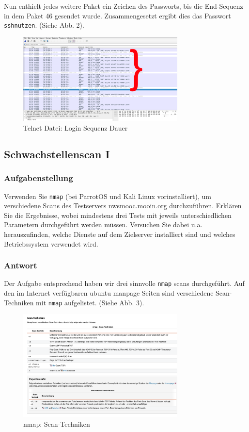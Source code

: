 \documentclass{article}
\begin{document}
Nun enthielt jedes weitere Paket ein Zeichen des Passworts, bis die End-Sequenz
in dem Paket 46 gesendet wurde. Zusammengesetzt ergibt dies das 
Passwort \texttt{sshnutzen}. (Siehe Abb. 2).

\begin{figure}[H]
	\includegraphics[width=0.75\textwidth]{images/02}
	\centering
	\caption{Telnet Datei: Login Sequenz Dauer}
\end{figure}

\newpage

\subsection{Schwachstellenscan I}

\subsubsection*{Aufgabenstellung}

Verwenden Sie \texttt{nmap} (bei ParrotOS und Kali Linux vorinstalliert), um verschiedene 
Scans des Testservers nwsmooc.mooin.org durchzuführen. Erklären Sie die Ergebnisse, wobei 
mindestens drei Tests mit jeweils unterschiedlichen Parametern durchgeführt werden müssen. 
Versuchen Sie dabei u.a. herauszufinden, welche Dienste auf dem Zielserver installiert
sind und welches Betriebssystem verwendet wird.

\subsubsection*{Antwort}

Der Aufgabe entsprechend haben wir drei sinnvolle \texttt{nmap} scans durchgeführt.
Auf den im Internet verfügbaren ubuntu manpage Seiten sind verschiedene Scan-Techniken mit
\texttt{nmap} aufgelistet. (Siehe Abb. 3).

\begin{figure}[H]
	\includegraphics[width=0.75\textwidth]{images/03}
	\centering
	\caption{nmap: Scan-Techniken}
\end{figure}
\end{document}
